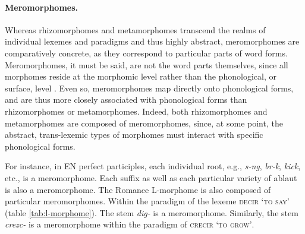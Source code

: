 \paragraph{Meromorphomes.} Whereas rhizomorphomes and metamorphomes 
transcend the realms of individual lexemes and paradigms and thus highly 
abstract, meromorphomes are comparatively concrete, as they 
correspond to particular parts of word forms. Meromorphomes, it must be said, 
are not the word parts themselves, since all morphomes reside at the 
morphomic level rather than the phonological, or surface, level \citep{round:2011}. 
Even so, meromorphomes map directly onto phonological forms, and 
are thus more closely associated with phonological forms than rhizomorphomes 
or metamorphomes. Indeed, both rhizomorphomes and metamorphomes are 
composed of meromorphomes, since, at some point, the abstract, trans-lexemic 
types of morphomes must interact with specific phonological forms. 

For instance, in \ac{EN} perfect participles, each individual root, e.g., \textit{s-ng}, 
\textit{br-k}, \textit{kick}, etc., is a meromorphome. Each suffix 
as well as each particular variety of ablaut is also a meromorphome. 
The Romance L-morphome is also composed of particular meromorphomes. 
Within the paradigm of the lexeme \textsc{decir} \textsc{`to say'} 
(table \ref{tab:l-morphome}). The stem \textit{dig-} is a meromorphome. 
Similarly, the stem \textit{crezc-} is a meromorphome within the paradigm of 
\textsc{crecir} \textsc{`to grow'}.

\begin{table}[ht]
\begin{center}
\label{tab:fusion}
\caption{Fusional suffixes in Hebrew nominals}
\end{center}
\end{table}

